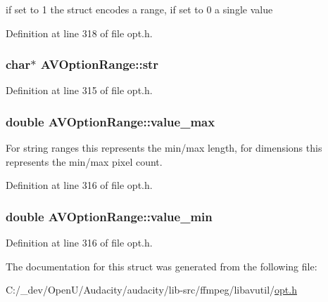 if set to 1 the struct encodes a range, if set to 0 a single value 



Definition at line 318 of file opt.\+h.

\subsubsection[{\texorpdfstring{str}{str}}]{ char$\ast$ A\+V\+Option\+Range\+::str}\hypertarget{struct_a_v_option_range_a354f95a62affe330479bb9941146d734}{}\label{struct_a_v_option_range_a354f95a62affe330479bb9941146d734}


Definition at line 315 of file opt.\+h.

\subsubsection[{\texorpdfstring{value\+\_\+max}{value_max}}]{\setlength{\rightskip}{0pt plus 5cm}double A\+V\+Option\+Range\+::value\+\_\+max}\hypertarget{struct_a_v_option_range_aa2876b63377f218ec0faa3482c467086}{}\label{struct_a_v_option_range_aa2876b63377f218ec0faa3482c467086}


For string ranges this represents the min/max length, for dimensions this represents the min/max pixel count. 



Definition at line 316 of file opt.\+h.

\subsubsection[{\texorpdfstring{value\+\_\+min}{value_min}}]{\setlength{\rightskip}{0pt plus 5cm}double A\+V\+Option\+Range\+::value\+\_\+min}\hypertarget{struct_a_v_option_range_adb21ecde2d4e6b47b9107816f9287ccb}{}\label{struct_a_v_option_range_adb21ecde2d4e6b47b9107816f9287ccb}


Definition at line 316 of file opt.\+h.



The documentation for this struct was generated from the following file\+:\begin{DoxyCompactItemize}
\item 
C\+:/\+\_\+dev/\+Open\+U/\+Audacity/audacity/lib-\/src/ffmpeg/libavutil/\hyperlink{opt_8h}{opt.\+h}\end{DoxyCompactItemize}

